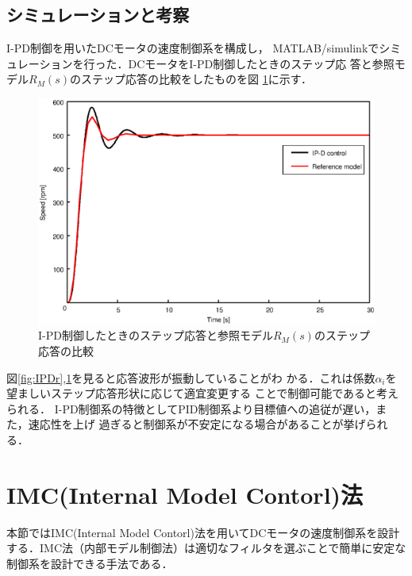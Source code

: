 \documentclass[a4paper,12pt]{jarticle}
\begin{document}
\subsection{シミュレーションと考察}
I-PD制御を用いたDCモータの速度制御系を構成し，
MATLAB/simulinkでシミュレーションを行った．DCモータをI-PD制御したときのステップ応
答と参照モデル$R_M(s)$のステップ応答の比較をしたものを図
\ref{fig:IPD_com}に示す．
%
\begin{figure}[tbp]
 \begin{center}
  \includegraphics[width = 150mm]{fig/IPD_com.eps}
 \end{center}
 \caption{I-PD制御したときのステップ応答と参照モデル$R_M(s)$のステップ応答の比較}
 \label{fig:IPD_com}
\end{figure}
%

図\ref{fig:IPDr},\ref{fig:IPD_com}を見ると応答波形が振動していることがわ
かる．これは係数$\alpha_i$を望ましいステップ応答形状に応じて適宜変更する
ことで制御可能であると考えられる．
%
I-PD制御系の特徴としてPID制御系より目標値への追従が遅い，また，速応性を上げ
過ぎると制御系が不安定になる場合があることが挙げられる．

\newpage

\section{IMC(Internal Model Contorl)法}
本節ではIMC(Internal Model Contorl)法を用いてDCモータの速度制御系を設計
する．IMC法（内部モデル制御法）は適切なフィルタを選ぶことで簡単に安定な
制御系を設計できる手法である．
\end{document}
